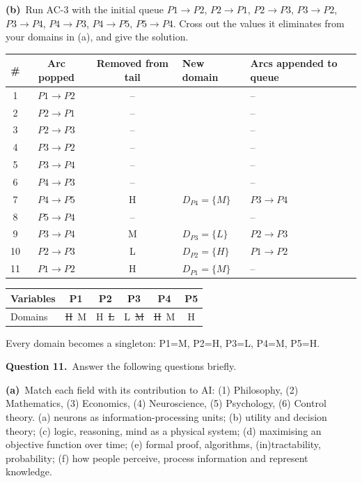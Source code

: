 \documentclass[11pt,a4paper]{article}
\newcommand{\question}[1]{\par\medskip\noindent\textbf{Question #1.}\ }
\newcommand{\subq}[1]{\par\smallskip\noindent\textbf{#1}\ }
\begin{document}
\subq{(b)}Run AC-3 with the initial queue $P1\to P2$, $P2\to P1$, $P2\to P3$, $P3\to P2$, $P3\to P4$, $P4\to P3$, $P4\to P5$, $P5\to P4$. Cross out the values it eliminates from your domains in (a), and give the solution.
\begin{solbox}
\begin{center}\small\begin{tabular}{c c c l p{5cm}}\toprule
\# & Arc popped & Removed from tail & New domain & Arcs appended to queue \\ \midrule
1 & $P1 \to P2$ & -- &  & -- \\
2 & $P2 \to P1$ & -- &  & -- \\
3 & $P2 \to P3$ & -- &  & -- \\
4 & $P3 \to P2$ & -- &  & -- \\
5 & $P3 \to P4$ & -- &  & -- \\
6 & $P4 \to P3$ & -- &  & -- \\
7 & $P4 \to P5$ & H & $D_{P4}=\{M\}$ & $P3\to P4$ \\
8 & $P5 \to P4$ & -- &  & -- \\
9 & $P3 \to P4$ & M & $D_{P3}=\{L\}$ & $P2\to P3$ \\
10 & $P2 \to P3$ & L & $D_{P2}=\{H\}$ & $P1\to P2$ \\
11 & $P1 \to P2$ & H & $D_{P1}=\{M\}$ & -- \\
\bottomrule\end{tabular}\end{center}\begin{center}\small\begin{tabular}{|l|c|c|c|c|c|}\hline Variables & \textbf{P1} & \textbf{P2} & \textbf{P3} & \textbf{P4} & \textbf{P5}\\ \hline Domains & \textcolor{red!70!black}{\sout{H}}\ M & H\ \textcolor{red!70!black}{\sout{L}} & L\ \textcolor{red!70!black}{\sout{M}} & \textcolor{red!70!black}{\sout{H}}\ M & H\\ \hline\end{tabular}\end{center}Every domain becomes a singleton: P1=M, P2=H, P3=L, P4=M, P5=H.
\end{solbox}
\question{11}Answer the following questions briefly.
\subq{(a)}Match each field with its contribution to AI: (1) Philosophy, (2) Mathematics, (3) Economics, (4) Neuroscience, (5) Psychology, (6) Control theory. (a) neurons as information-processing units; (b) utility and decision theory; (c) logic, reasoning, mind as a physical system; (d) maximising an objective function over time; (e) formal proof, algorithms, (in)tractability, probability; (f) how people perceive, process information and represent knowledge.
\end{document}
